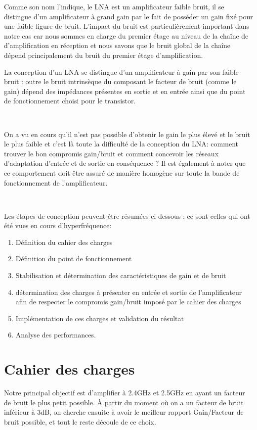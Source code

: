 \documentclass[12pt]{article}
\begin{document}
Comme son nom l'indique, le LNA est un amplificateur faible bruit, il se distingue d'un amplificateur à grand gain par le fait de posséder un gain fixé pour une faible figure de bruit. L'impact du bruit est particulièrement important dans notre cas car nous sommes en charge du premier étage au niveau de la chaîne de d'amplification en réception et nous savons que le bruit global de la chaîne dépend principalement du bruit du premier étage d'amplification.

La conception d'un LNA se distingue d'un amplificateur à gain par son faible bruit : outre le bruit intrinsèque du composant le facteur de bruit (comme le gain) dépend des impédances présentes en sortie et en entrée ainsi que du point de fonctionnement choisi pour le transistor. 

~

On a vu en cours qu'il n'est pas possible d'obtenir le gain le plus élevé et le bruit le plus faible et c'est là toute la difficulté de la conception du LNA: comment trouver le bon compromis gain/bruit et comment concevoir les réseaux d'adaptation d'entrée et de sortie en conséquence ?
Il est également à noter que ce comportement doit être assuré de manière homogène sur toute la bande de fonctionnement de l'amplificateur.

~

Les étapes de conception peuvent être résumées ci-dessous : ce sont celles qui ont été vues en cours d'hyperfréquence:

\begin{enumerate}
\item Définition du cahier des charges
\item Définition du point de fonctionnement
\item Stabilisation et détermination des caractéristiques de gain et de bruit
\item détermination des charges à présenter en entrée et sortie de l'amplificateur afin de
respecter le compromis gain/bruit imposé par le cahier des charges
\item Implémentation de ces charges et validation du résultat
\item Analyse des performances.
\end{enumerate}

\section{Cahier des charges}

Notre principal objectif est d’amplifier à 2.4GHz et 2.5GHz en ayant un facteur de bruit le plus petit possible. À partir du moment où on a un facteur de bruit inférieur à 3dB, on cherche ensuite à avoir le meilleur rapport Gain/Facteur de bruit possible, et tout le reste découle de ce choix.
\end{document}
